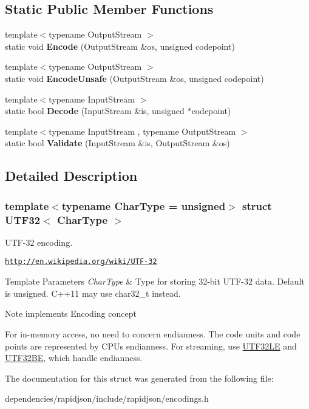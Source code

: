 \subsection*{Static Public Member Functions}
\begin{DoxyCompactItemize}
\item 
\mbox{\label{struct_u_t_f32_a511d1b09672ce535085895a28d8c2f13}} 
{\footnotesize template$<$typename Output\+Stream $>$ }\\static void {\bfseries Encode} (Output\+Stream \&os, unsigned codepoint)
\item 
\mbox{\label{struct_u_t_f32_ae50dd8dff92c36ee184c6d4eccb1961e}} 
{\footnotesize template$<$typename Output\+Stream $>$ }\\static void {\bfseries Encode\+Unsafe} (Output\+Stream \&os, unsigned codepoint)
\item 
\mbox{\label{struct_u_t_f32_a6e7258a5e982e101345dffdc355e9b53}} 
{\footnotesize template$<$typename Input\+Stream $>$ }\\static bool {\bfseries Decode} (Input\+Stream \&is, unsigned $\ast$codepoint)
\item 
\mbox{\label{struct_u_t_f32_a71336fb0546b3079e01bbd51d2fa2e45}} 
{\footnotesize template$<$typename Input\+Stream , typename Output\+Stream $>$ }\\static bool {\bfseries Validate} (Input\+Stream \&is, Output\+Stream \&os)
\end{DoxyCompactItemize}


\subsection{Detailed Description}
\subsubsection*{template$<$typename Char\+Type = unsigned$>$\newline
struct U\+T\+F32$<$ Char\+Type $>$}

U\+T\+F-\/32 encoding. 

\href{http://en.wikipedia.org/wiki/UTF-32}{\tt http\+://en.\+wikipedia.\+org/wiki/\+U\+T\+F-\/32} 
\begin{DoxyTemplParams}{Template Parameters}
{\em Char\+Type} & Type for storing 32-\/bit U\+T\+F-\/32 data. Default is unsigned. C++11 may use char32\+\_\+t instead. \\
\hline
\end{DoxyTemplParams}
\begin{DoxyNote}{Note}
implements Encoding concept

For in-\/memory access, no need to concern endianness. The code units and code points are represented by C\+PU\textquotesingle{}s endianness. For streaming, use \hyperlink{struct_u_t_f32_l_e}{U\+T\+F32\+LE} and \hyperlink{struct_u_t_f32_b_e}{U\+T\+F32\+BE}, which handle endianness. 
\end{DoxyNote}


The documentation for this struct was generated from the following file\+:\begin{DoxyCompactItemize}
\item 
dependencies/rapidjson/include/rapidjson/encodings.\+h\end{DoxyCompactItemize}

